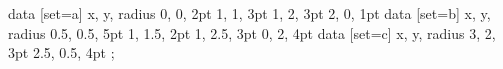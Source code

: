 \begin{codeexample}[width=7cm]
\tikz \datavisualization [
  scientific clean axes,
  visualize as circle/.list={a, b, c},
  style sheet=strong colors]
data [set=a] {
  x, y, radius
  0, 0, 2pt
  1, 1, 3pt
  1, 2, 3pt
  2, 0, 1pt
}
data [set=b] {
  x, y, radius
  0.5, 0.5, 5pt
  1, 1.5, 2pt
  1, 2.5, 3pt
  0, 2, 4pt
}
data [set=c] {
  x, y, radius
  3, 2, 3pt
  2.5, 0.5, 4pt
};  
\end{codeexample}
